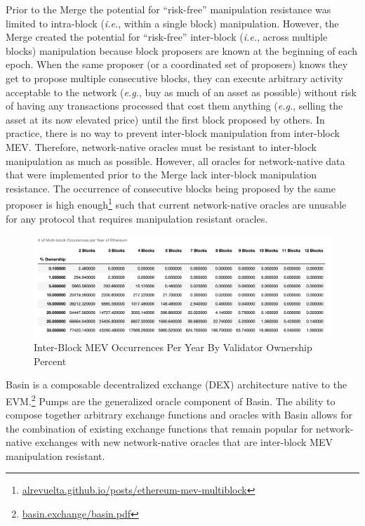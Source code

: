 \documentclass[tikz]{article}
\newcommand{\fref}[1]{\footnote{\href{http://#1}{#1}}}
\begin{document}
Prior to the Merge the potential for “risk-free” manipulation resistance was limited to intra-block (\textit{i.e.}, within a single block) manipulation. However, the Merge created the potential for “risk-free” inter-block (\textit{i.e.}, across multiple blocks) manipulation because block proposers are known at the beginning of each epoch. When the same proposer (or a coordinated set of proposers) knows they get to propose multiple consecutive blocks, they can execute arbitrary activity acceptable to the network (\textit{e.g.}, buy as much of an asset as possible) without risk of having any transactions processed that cost them anything (\textit{e.g.}, selling the asset at its now elevated price) until the first block proposed by others. In practice, there is no way to prevent inter-block manipulation from inter-block MEV. Therefore, network-native oracles must be resistant to inter-block manipulation as much as possible. However, all oracles for network-native data that were implemented prior to the Merge lack inter-block manipulation resistance. The occurrence of consecutive blocks being proposed by the same proposer is high enough\fref{alrevuelta.github.io/posts/ethereum-mev-multiblock} such that current network-native oracles are unusable for any protocol that requires manipulation resistant oracles. 

\vspace*{-1mm}
\begin{figure}[h!]
    \centering
    \includegraphics[scale=.25]{Figure15}
    \vspace*{-7mm}
    \caption{Inter-Block MEV Occurrences Per Year By Validator Ownership Percent}
    \label{fig 2}
\end{figure}

Basin is a composable decentralized exchange (DEX) architecture native to the EVM.\footnote{\href{https://basin.exchange/basin.pdf}{basin.exchange/basin.pdf}} Pumps are the generalized oracle component of Basin. The ability to compose together arbitrary exchange functions and oracles with Basin allows for the combination of existing exchange functions that remain popular for network-native exchanges with new network-native oracles that are inter-block MEV manipulation resistant.
\end{document}
